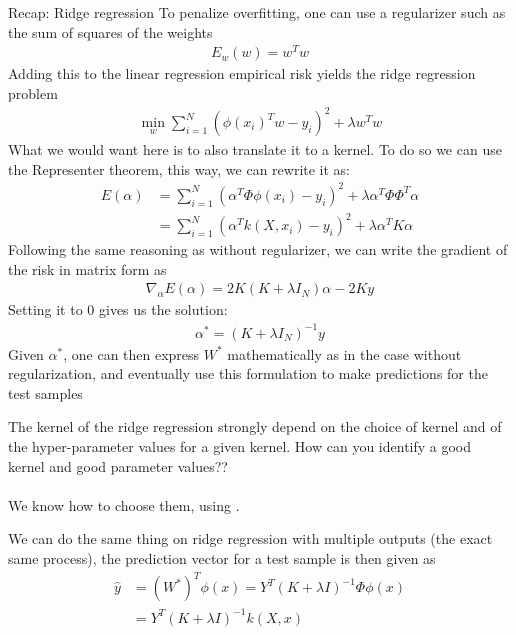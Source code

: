 \begin{parag}{Recap: Ridge regression}
    To penalize overfitting, one can use a regularizer such as the sum of squares of the weights
	\begin{align*} 
		E_w\left(w\right) = w^{T}w
	\end{align*}
	Adding this to the linear regression empirical risk yields the ridge regression problem
	\begin{align*} 
		\min_w \sum_{i= 1}^{N} \left(\phi\left(x_i\right)^{T}w - y_i\right)^2 + \lambda w^{T}w
	\end{align*}
	What we would want here is to also translate it to a kernel. To do so we can use the Representer theorem, this way, we can rewrite it as:
	\begin{align*} 
		E\left(\alpha\right) &=  \sum_{i= 1}^{N}\left(\alpha^T\Phi\phi\left(x_i\right) - y_i\right)^2 + \lambda \alpha^T\Phi\Phi^{T}\alpha\\
		&= \sum_{i= 1}^{N}\left(\alpha^Tk\left(X, x_i\right) - y_i\right)^2 + \lambda \alpha^TK\alpha
	\end{align*}
	Following the same reasoning as without regularizer, we can write the gradient of the risk in matrix form as 
	\begin{align*} 
		\nabla_{\alpha}E\left(\alpha\right) = 2K\left(K + \lambda I_N\right)\alpha - 2Ky
	\end{align*}
	Setting it to 0 gives us the solution:
	\begin{align*} 
		\alpha^\ast =  \left(K + \lambda I_N\right)^{-1} y
	\end{align*}
	Given $\alpha^\ast$, one can then express $W^{\ast}$ mathematically as in the case without regularization, and eventually use this formulation to make predictions for the test samples
\end{parag}
The kernel of the ridge regression strongly depend on the choice of kernel and of the hyper-parameter values for a given kernel. How can you identify a good kernel and good parameter values??\\
$ $\\
We know how to choose them, using . 
\begin{framedremark}
We can do the same thing on ridge regression with multiple outputs (the exact same process), the prediction vector for a test sample is then given as 
\begin{align*} 
	\hat{y} &= \left(W^{\ast}\right)^{T}\phi\left(x\right) =  Y^{T}\left(K + \lambda I\right)^{-1}\Phi \phi\left(x\right)\\
	&=  Y^{T}\left(K + \lambda I\right)^{-1}k\left(X, x\right)
\end{align*}
\end{framedremark}






